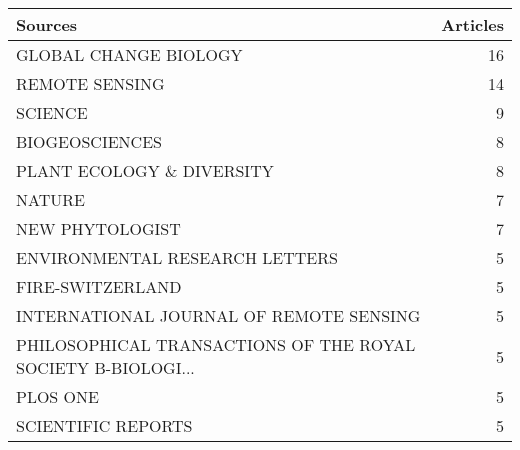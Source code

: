 
\begin{tabular}{lr}
\toprule
Sources & Articles\\
\midrule
GLOBAL CHANGE BIOLOGY & 16\\
REMOTE SENSING & 14\\
SCIENCE & 9\\
BIOGEOSCIENCES & 8\\
PLANT ECOLOGY \& DIVERSITY & 8\\
\addlinespace
NATURE & 7\\
NEW PHYTOLOGIST & 7\\
ENVIRONMENTAL RESEARCH LETTERS & 5\\
FIRE-SWITZERLAND & 5\\
INTERNATIONAL JOURNAL OF REMOTE SENSING & 5\\
\addlinespace
PHILOSOPHICAL TRANSACTIONS OF THE ROYAL SOCIETY B-BIOLOGI... & 5\\
PLOS ONE & 5\\
SCIENTIFIC REPORTS & 5\\
\bottomrule
\end{tabular}